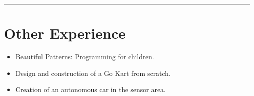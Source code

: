 \documentclass[11pt,a4paper]{article}
\begin{document}
\begin{minipage}[t]{0.65\textwidth}
\vspace*{2em}
{\color{lightgray}\hrule}

\section*{Other Experience}
\footnotesize
\begin{itemize}
    \item Beautiful Patterns: Programming for children.
    \item Design and construction of a Go Kart from scratch.
    \item Creation of an autonomous car in the sensor area.
\end{itemize}

\vspace*{\fill}

\end{minipage}
\end{document}
